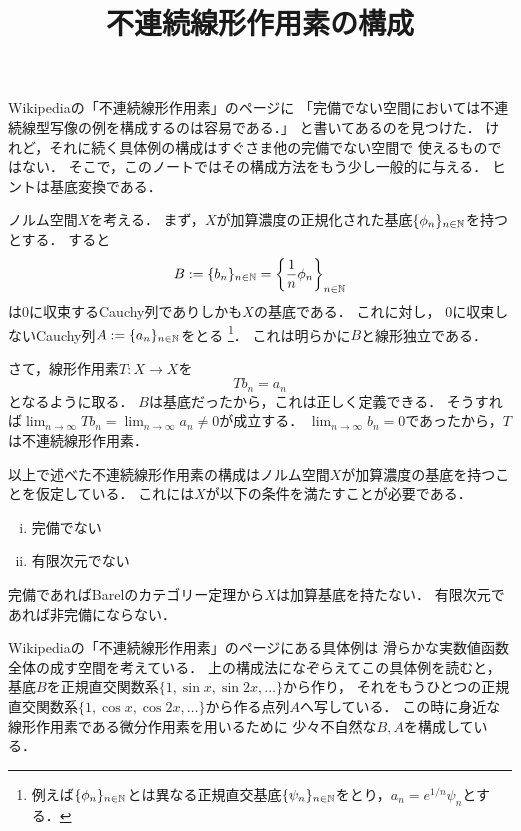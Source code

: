 \documentclass[a4j]{jarticle}
\title{不連続線形作用素の構成}
\begin{document}
\maketitle
Wikipediaの「不連続線形作用素」のページに
「完備でない空間においては不連続線型写像の例を構成するのは容易である．」
と書いてあるのを見つけた．
けれど，それに続く具体例の構成はすぐさま他の完備でない空間で
使えるものではない．
そこで，このノートではその構成方法をもう少し一般的に与える．
ヒントは基底変換である．

ノルム空間$X$を考える．
まず，$X$が加算濃度の正規化された基底$\{ \phi_n \}_{n \in \mathbb{N}}$を持つとする．
すると
\[ B:=\{b_n\}_{n \in \mathbb{N}}=\left\{\frac{1}{n} \phi_n \right\}_{n \in \mathbb{N}} \]
は0に収束するCauchy列でありしかも$X$の基底である．
これに対し，
0に収束しないCauchy列$A:=\{ a_n \}_{n \in \mathbb{N}}$をとる
\footnote{例えば$\{ \phi_n \}_{n \in \mathbb{N}}$とは異なる正規直交基底$\{ \psi_n \}_{n \in \mathbb{N}}$をとり，$a_n=e^{1/n} \psi_n$とする．}．
これは明らかに$B$と線形独立である．

さて，線形作用素$T:X \to X$を
\[ Tb_n=a_n \]
となるように取る．
$B$は基底だったから，これは正しく定義できる．
そうすれば$\lim_{n \to \infty} Tb_n=\lim_{n \to \infty} a_n \neq 0$が成立する．
$\lim_{n \to \infty} b_n=0$であったから，$T$は不連続線形作用素．

以上で述べた不連続線形作用素の構成はノルム空間$X$が加算濃度の基底を持つことを仮定している．
これには$X$が以下の条件を満たすことが必要である．
\begin{enumerate}[i)]
    \item 完備でない
    \item 有限次元でない
\end{enumerate}
完備であればBarelのカテゴリー定理から$X$は加算基底を持たない．
有限次元であれば非完備にならない．

Wikipediaの「不連続線形作用素」のページにある具体例は
滑らかな実数値函数全体の成す空間を考えている．
上の構成法になぞらえてこの具体例を読むと，
基底$B$を正規直交関数系$\{ 1, \sin x, \sin 2x, \dots \}$から作り，
それをもうひとつの正規直交関数系$\{ 1, \cos x, \cos 2x, \dots \}$から作る点列$A$へ写している．
この時に身近な線形作用素である微分作用素を用いるために
少々不自然な$B,A$を構成している．
\end{document}
